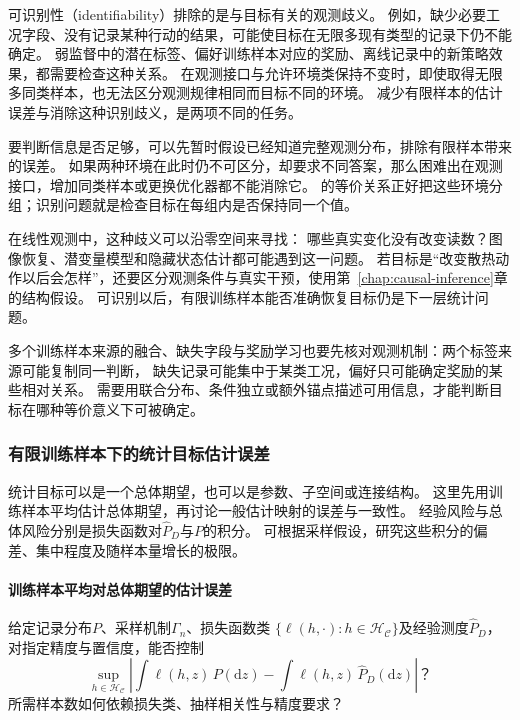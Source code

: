可识别性（identifiability）排除的是与目标有关的观测歧义。
例如，缺少必要工况字段、没有记录某种行动的结果，可能使目标在无限多现有类型的记录下仍不能确定。
弱监督中的潜在标签、偏好训练样本对应的奖励、离线记录中的新策略效果，都需要检查这种关系。
在观测接口与允许环境类保持不变时，即使取得无限多同类样本，也无法区分观测规律相同而目标不同的环境。
减少有限样本的估计误差与消除这种识别歧义，是两项不同的任务。

要判断信息是否足够，可以先暂时假设已经知道完整观测分布，排除有限样本带来的误差。
如果两种环境在此时仍不可区分，却要求不同答案，那么困难出在观测接口，增加同类样本或更换优化器都不能消除它。
的等价关系正好把这些环境分组；识别问题就是检查目标在每组内是否保持同一个值。

在线性观测中，这种歧义可以沿零空间来寻找：
哪些真实变化没有改变读数？图像恢复、潜变量模型和隐藏状态估计都可能遇到这一问题。
若目标是“改变散热动作以后会怎样”，还要区分观测条件与真实干预，使用第~\ref{chap:causal-inference}章的结构假设。
可识别以后，有限训练样本能否准确恢复目标仍是下一层统计问题。

多个训练样本来源的融合、缺失字段与奖励学习也要先核对观测机制：两个标签来源可能复制同一判断，
缺失记录可能集中于某类工况，偏好只可能确定奖励的某些相对关系。
需要用联合分布、条件独立或额外锚点描述可用信息，才能判断目标在哪种等价意义下可被确定。

\subsubsection{有限训练样本下的统计目标估计误差}
\label{sec:future-analysis-generalization}

统计目标可以是一个总体期望，也可以是参数、子空间或连接结构。
这里先用训练样本平均估计总体期望，再讨论一般估计映射的误差与一致性。
经验风险与总体风险分别是损失函数对$\widehat P_D$与$P$的积分。
可根据采样假设，研究这些积分的偏差、集中程度及随样本量增长的极限。

\paragraph{训练样本平均对总体期望的估计误差}

\begin{mathproblem}[有限训练样本对总体泛函的近似]
  \label{question:future-generalization}
  给定记录分布$P$、采样机制$\Gamma_n$、损失函数类
  $\{\ell(h,\cdot):h\in\mathcal H_{\mathcal C}\}$及经验测度$\widehat P_D$，
  对指定精度与置信度，能否控制
  \[
    \sup_{h\in\mathcal H_{\mathcal C}}
      \left|\int\ell(h,z)\,P(\mathrm dz)
      -\int\ell(h,z)\,\widehat P_D(\mathrm dz)\right|\text{？}
  \]
  所需样本数如何依赖损失类、抽样相关性与精度要求？
\end{mathproblem}

